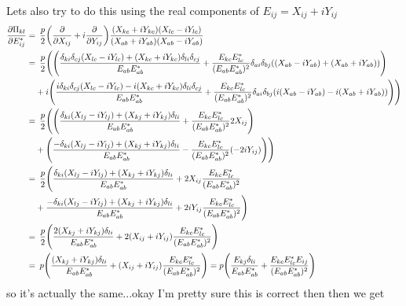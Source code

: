 \documentclass{article}
\newcommand{\YY}[3][j]{E_{#2#1}E_{#3#1}^*}
\begin{document}
{{    Lets also try to do this using the real components of $E_{ij} = X_{ij} + i Y_{ij}$
    \begin{align}
        \pdv{\Pi_{kl}}{E_{ij}^*} =&\enspace \frac{p}{2} \qty(\pdv{X_{ij}} + i\pdv{Y_{ij}}) \frac{(X_{kc} + iY_{kc})(X_{lc} - iY_{lc})}{(X_{ab} + iY_{ab})(X_{ab} - iY_{ab})} \\
        =&\enspace \frac{p}{2} \Biggl(\Biggl(\frac{\delta_{ki}\delta_{cj}(X_{lc} - iY_{lc}) + (X_{kc} + iY_{kc})\delta_{li}\delta_{cj}}{\YY[b]{a}{a}} + \frac{\YY[c]{k}{l}}{(\YY[b]{a}{a})^2}\delta_{ai}\delta_{bj}\qty((X_{ab}-iY_{ab}) + (X_{ab} + iY_{ab})) \Biggr) \\
        &+ i\Biggl( \frac{i\delta_{ki}\delta_{cj}(X_{lc} - iY_{lc}) - i(X_{kc} + iY_{kc})\delta_{li}\delta_{cj}}{\YY[b]{a}{a}} + \frac{\YY[c]{k}{l}}{(\YY[b]{a}{a})^2}\delta_{ai}\delta_{bj}\qty(i(X_{ab}-iY_{ab}) - i(X_{ab} + iY_{ab})) \Biggr) \Biggr) \\
        =&\enspace \frac{p}{2} \Biggl(\Biggl(\frac{\delta_{ki}(X_{lj} - iY_{lj}) + (X_{kj} + iY_{kj})\delta_{li}}{\YY[b]{a}{a}} + \frac{\YY[c]{k}{l}}{(\YY[b]{a}{a})^2}2X_{ij} \Biggr) \\
        &+ \Biggl( \frac{-\delta_{ki}(X_{lj} - iY_{lj}) + (X_{kj} + iY_{kj})\delta_{li}}{\YY[b]{a}{a}} - \frac{\YY[c]{k}{l}}{(\YY[b]{a}{a})^2}\qty(-2iY_{ij}) \Biggr) \Biggr) \\
        =&\enspace \frac{p}{2} \Biggl(\frac{\delta_{ki}(X_{lj} - iY_{lj}) + (X_{kj} + iY_{kj})\delta_{li}}{\YY[b]{a}{a}} + 2X_{ij}\frac{\YY[c]{k}{l}}{(\YY[b]{a}{a})^2} \\
        &+ \frac{-\delta_{ki}(X_{lj} - iY_{lj}) + (X_{kj} + iY_{kj})\delta_{li}}{\YY[b]{a}{a}} + 2iY_{ij}\frac{\YY[c]{k}{l}}{(\YY[b]{a}{a})^2} \Biggr) \\
        =&\enspace \frac{p}{2} \Biggl(\frac{2(X_{kj} + iY_{kj})\delta_{li}}{\YY[b]{a}{a}} + 2(X_{ij} + iY_{ij})\frac{\YY[c]{k}{l}}{(\YY[b]{a}{a})^2} \Biggr) \\
        =&\enspace p \Biggl(\frac{(X_{kj} + iY_{kj})\delta_{li}}{\YY[b]{a}{a}} + (X_{ij} + iY_{ij})\frac{\YY[c]{k}{l}}{(\YY[b]{a}{a})^2} \Biggr) = p \Biggl(\frac{E_{kj}\delta_{li}}{\YY[b]{a}{a}} + \frac{\YY[c]{k}{l}E_{ij}}{(\YY[b]{a}{a})^2}\Biggr)
    \end{align}
    so it's actually the same...okay I'm pretty sure this is correct then
}}
then we get
\end{document}
